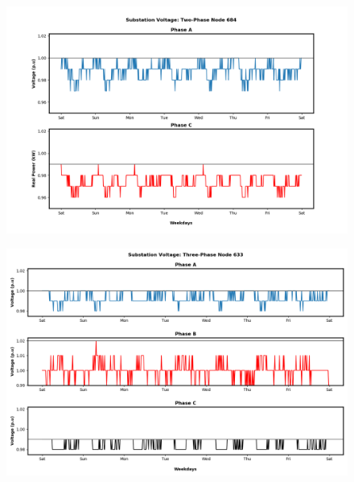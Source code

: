 \begin{figure}[H]
    \centering
    \includegraphics[width=1.1\columnwidth]{Pictures/fourty_two_phase_684_volt.png}
    \caption{ }
\end{figure}

\newpage

\begin{figure}[H]
    \centering
    \includegraphics[width=1.1\columnwidth]{Pictures/fourty_three_phase_633_volt.png}
    \caption{ }
\end{figure}

\newpage



